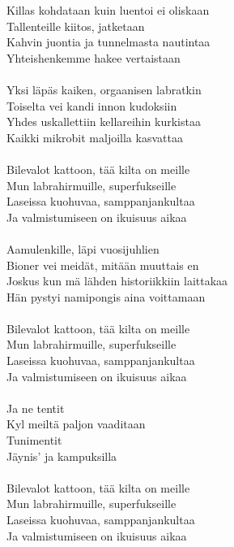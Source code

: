
Killas kohdataan kuin luentoi ei oliskaan \\ Tallenteille kiitos, jatketaan \\ Kahvin juontia ja tunnelmasta nautintaa \\ Yhteishenkemme hakee vertaistaan \\ \hspace{10mm} \\ Yksi läpäs kaiken, orgaanisen labratkin \\ Toiselta vei kandi innon kudoksiin \\ Yhdes uskallettiin kellareihin kurkistaa \\ Kaikki mikrobit maljoilla kasvattaa \\ \hspace{10mm} \\ Bilevalot kattoon, tää kilta on meille \\ Mun labrahirmuille, superfukseille \\ Laseissa kuohuvaa, samppanjankultaa \\ Ja valmistumiseen on ikuisuus aikaa \\ \hspace{10mm} \\ Aamulenkille, läpi vuosijuhlien \\ Bioner vei meidät, mitään muuttais en \\ Joskus kun mä lähden historiikkiin laittakaa \\ Hän pystyi namipongis aina voittamaan \\ \hspace{10mm} \\ Bilevalot kattoon, tää kilta on meille \\ Mun labrahirmuille, superfukseille \\ Laseissa kuohuvaa, samppanjankultaa \\ Ja valmistumiseen on ikuisuus aikaa \\ \hspace{10mm} \\ Ja ne tentit \\ Kyl meiltä paljon vaaditaan \\ Tunimentit \\ Jäynis' ja kampuksilla \\ \hspace{10mm} \\ Bilevalot kattoon, tää kilta on meille \\ Mun labrahirmuille, superfukseille \\ Laseissa kuohuvaa, samppanjankultaa \\ Ja valmistumiseen on ikuisuus aikaa